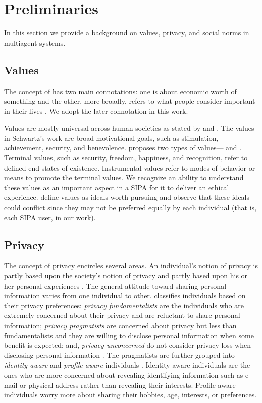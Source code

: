 \section{Preliminaries}

In this section we provide a background on values, privacy, and social norms in
multiagent systems.

\subsection{Values}

The concept of  has two main connotations: one is about economic worth of something and the other, more broadly, refers to what people consider important in their lives \citep{Friedman-2008-value-sensitive-design}. 
We adopt the later connotation in this work.

Values are mostly universal across human societies as stated by \citet{schwartz2012overview} and \citet{rokeach1973nature}. 
The values in Schwartz's  work are broad motivational goals, such as stimulation, achievement, security, and benevolence. 
\citet{rokeach1973nature} proposes two types of values--- and . 
Terminal values, such as security, freedom, happiness, and recognition, refer to defined-end states of existence. 
Instrumental values refer to modes of behavior or means to promote the terminal values. 
%
We recognize an ability to understand these values as an important aspect in a SIPA for it to deliver an ethical experience.
\citet{Dechesne-AIL13-Norms+Values} define values as ideals worth pursuing and observe that these ideals could conflict since
they may not be preferred equally by each individual (that is, each SIPA user, in our work).


\subsection{Privacy}
The concept of privacy encircles several areas. An individual's notion of
privacy is partly based upon the society's notion of privacy and partly
based upon his or her personal experiences \citep{westin1967privacy,
westin2003social}. The general attitude toward sharing personal
information varies from one individual to other.
\citet{westin1967privacy} classifies individuals based on their privacy
preferences: \textit{privacy fundamentalists} are the individuals who
are extremely concerned about their privacy and are reluctant to share
personal information; \textit{privacy pragmatists} are concerned about
privacy but less than fundamentalists and they are willing to disclose
personal information when some benefit is expected; and,
\textit{privacy unconcerned} do not consider privacy loss when
disclosing personal information \citep{westin1967privacy}. The
pragmatists are further grouped into \emph{identity-aware} and \emph{profile-aware}
individuals \citep{spiekermann2009enggprivacy}. Identity-aware
individuals are the ones who are more concerned about revealing
identifying information such as e-mail or physical address rather than
revealing their interests. Profile-aware individuals worry more about
sharing their hobbies, age, interests, or preferences.

